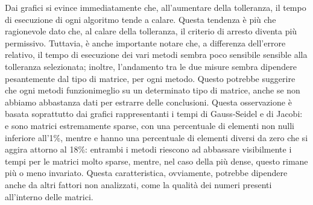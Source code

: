 Dai grafici si evince immediatamente che, all'aumentare della tolleranza, il tempo di esecuzione di ogni algoritmo tende a calare. Questa tendenza è più che ragionevole dato che, al calare della tolleranza, il criterio di arresto diventa più permissivo.
Tuttavia, è anche importante notare che, a differenza dell'errore relativo, il tempo di esecuzione dei vari metodi sembra poco sensibile sensible alla tolleranza selezionata; inoltre, l'andamento tra le due misure sembra dipendere pesantemente dal tipo di matrice, per ogni metodo. Questo potrebbe suggerire che ogni metodi funzionimeglio su un determinato tipo di matrice, anche se non abbiamo abbastanza dati per estrarre delle conclusioni. Questa osservazione è basata soprattutto dai grafici rappresentanti i tempi di Gauss-Seidel e di Jacobi:  e  sono matrici estremamente sparse, con una percentuale di elementi non nulli inferiore all'1\%, mentre  e  hanno una percentuale di elementi diversi da zero che si aggira attorno al 18\%: entrambi i metodi riescono ad abbassare visibilmente i tempi per le matrici molto sparse, mentre, nel caso della più dense, questo rimane più o meno invariato. Questa caratteristica, ovviamente, potrebbe dipendere anche da altri fattori non analizzati, come la qualità dei numeri presenti all'interno delle matrici.






